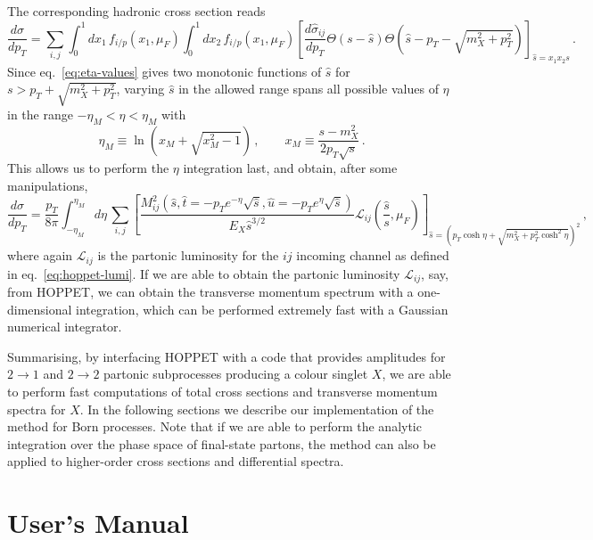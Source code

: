 \documentclass[12pt]{article}
\begin{document}
The corresponding hadronic cross section reads
\begin{equation}
\label{eq:hadronic-pt}
  \frac{d\sigma}{dp_T} = \sum_{i,j} \int_0^1 dx_1\, f_{i/p}(x_1,\mu_F)\int_0^1 dx_2 \, f_{i/p}(x_1,\mu_F) \left[\frac{d\hat \sigma_{ij}}{dp_T} \Theta(s-\hat s) \Theta\left(\hat s-p_T-\sqrt{m_X^2+p^2_T}\right)  \right]_{\hat s=x_1x_2 s}\,.
\end{equation}
Since eq.~\eqref{eq:eta-values} gives two monotonic functions of $\hat s$ for $s>p_T+\sqrt{m_X^2+p^2_T}$, varying $\hat s$ in the allowed range spans all possible values of $\eta$ in the range $-\eta_M<\eta<\eta_M$ with
\begin{equation}
\label{eq:eta-range}
\eta_M \equiv \ln(x_M + \sqrt{x_M^2-1})\,,\qquad  x_M\equiv\frac{s-m_X^2}{2 p_T \sqrt{s} }\,.
\end{equation}
This allows us to perform the  $\eta$ integration last, and obtain, after some
manipulations,
\begin{equation}
\label{eq:hadronic-pt-lumi}
  \frac{d\sigma}{dp_T} = \frac{p_T}{8 \pi}\int_{-\eta_M}^{\eta_M}\!d\eta\, \sum_{i,j}  \left[\frac{M^2_{ij}\left(\hat s,\hat t=-p_T e^{-\eta}\sqrt {\hat s}  ,\hat u =- p_T e^{\eta}\sqrt{\hat s}\right)}{E_X \hat s^{3/2}}\mathcal{L}_{ij}\left(\frac{\hat s}{s},\mu_F\right) \right]_{\hat s=\left(p_T\cosh\eta+\sqrt{m_X^2+p^2_T\cosh^2\eta}\right)^2}\,,
\end{equation}
where again $\mathcal{L}_{ij}$ is the partonic luminosity for the $ij$
incoming channel as defined in eq.~\eqref{eq:hoppet-lumi}. If we are
able to obtain the partonic luminosity $\mathcal{L}_{ij}$, say, from
\textsc{HOPPET}, we can obtain the transverse momentum spectrum with a
one-dimensional integration, which can be performed extremely fast
with a Gaussian numerical integrator.

Summarising, by interfacing \textsc{HOPPET} with a code that provides
amplitudes for $2\to 1$ and $2\to 2$ partonic subprocesses producing a
colour singlet $X$, we are able to perform fast computations of total
cross sections and transverse momentum spectra for $X$. In the
following sections we describe our implementation of the method for
Born processes. Note that if we are able to perform the analytic
integration over the phase space of final-state partons, the method
can also be applied to higher-order cross sections and differential
spectra.

\section{User's Manual}
\label{sec:manual} 
\end{document}
